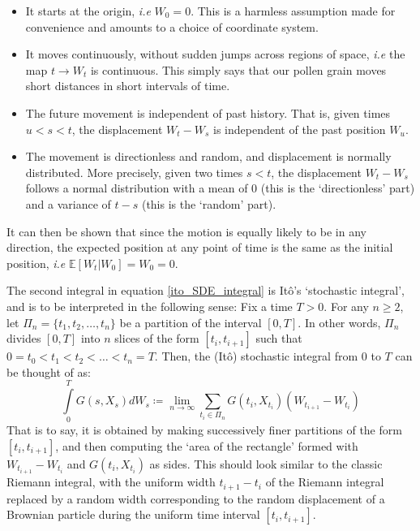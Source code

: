 \begin{itemize}
	\item It starts at the origin, \emph{i.e} $W_0 = 0$. This is a harmless assumption made for convenience and amounts to a choice of coordinate system.
	\item It moves continuously, without sudden jumps across regions of space, \emph{i.e} the map $t \to W_t$ is continuous. This simply says that our pollen grain moves short distances in short intervals of time.
	\item The future movement is independent of past history. That is, given times $u < s < t$, the displacement $W_t - W_s$ is independent of the past position $W_u$.
	\item The movement is directionless and random, and displacement is normally distributed. More precisely, given two times $s < t$, the displacement $W_t - W_s$ follows a normal distribution with a mean of $0$ (this is the `directionless' part) and a variance of $t-s$ (this is the `random' part).
\end{itemize}
It can then be shown that since the motion is equally likely to be in any direction, the expected position at any point of time is the same as the initial position, \emph{i.e} $\mathbb{E}[W_t | W_0] = W_0 = 0$.

The second integral in equation \eqref{ito_SDE_integral} is It\^o's `stochastic integral', and is to be interpreted in the following sense: Fix a time $T > 0$. For any $n\geq2$, let $\Pi_n = \{t_1,t_2,\ldots,t_n\}$ be a partition of the interval $[0,T]$. In other words, $\Pi_n$ divides $[0,T]$ into $n$ slices of the form $[t_i,t_{i+1}]$ such that $0 = t_0 < t_1 < t_2 < \ldots < t_n = T$. Then, the (It\^o) stochastic integral from $0$ to $T$ can be thought of as:
\begin{equation*}
\int\limits_{0}^{T} G(s,X_s)dW_s \coloneqq \lim_{n \to \infty} \sum\limits_{t_i \in \Pi_n}G(t_i,X_{t_i})(W_{t_{i+1}}-W_{t_i})  
\end{equation*}
That is to say, it is obtained by making successively finer partitions of the form $[t_i,t_{i+1}]$, and then computing the `area of the rectangle' formed with $W_{t_{i+1}}-W_{t_i}$ and $G(t_i,X_{t_i})$ as sides. This should look similar to the classic Riemann integral, with the uniform width $t_{i+1}-t_i$ of the Riemann integral replaced by a random width corresponding to the random displacement of a Brownian particle during the uniform time interval $[t_i,t_{i+1}]$.

